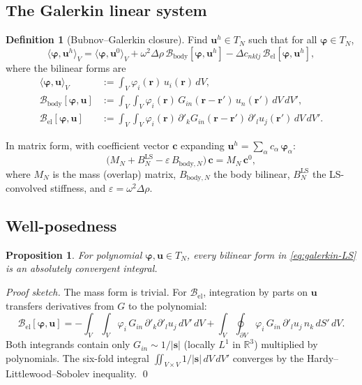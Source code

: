 \documentclass[11pt,a4paper]{article}
\newcommand{\D}{\Delta}
\newcommand{\bs}{\bm{s}}
\newcommand{\br}{\bm{r}}
\newcommand{\bu}{\bm{u}}
\newcommand{\bphi}{\bm{\varphi}}
\newcommand{\R}{\mathbb{R}}
\newcommand{\Bbody}{\mathcal{B}_{\mathrm{body}}}
\newcommand{\Bel}{\mathcal{B}_{\mathrm{el}}}
\newcommand{\BLS}{B^{\mathrm{LS}}}
\theoremstyle{plain}
\newtheorem{proposition}[theorem]{Proposition}
\theoremstyle{definition}
\newtheorem{definition}[theorem]{Definition}
\theoremstyle{remark}
\begin{document}
\subsection{The Galerkin linear system}

\begin{definition}[Bubnov--Galerkin closure]
Find $\bu^h \in T_N$ such that for all $\bphi \in T_N$,
\begin{equation}
  \langle\bphi,\bu^h\rangle_V
  = \langle\bphi,\bu^0\rangle_V
  + \omega^2\D\rho\,\Bbody[\bphi,\bu^h]
  - \D c_{nklj}\,\Bel[\bphi,\bu^h],
  \label{eq:galerkin-LS}
\end{equation}
where the bilinear forms are
\begin{align}
  \langle\bphi,\bu\rangle_V &:= \int_V \varphi_i(\br)\,u_i(\br)\,dV,
  \label{eq:mass-form}\\[4pt]
  \Bbody[\bphi,\bu] &:= \int_V\!\!\int_V \varphi_i(\br)\,
    G_{in}(\br-\br')\,u_n(\br')\,dV\,dV',
  \label{eq:body-form}\\[4pt]
  \Bel[\bphi,\bu] &:= \int_V\!\!\int_V \varphi_i(\br)\,
    \partial'_k G_{in}(\br-\br')\,\partial'_l u_j(\br')\,dV\,dV'.
  \label{eq:elastic-form}
\end{align}
\end{definition}

In matrix form, with coefficient vector $\bm{c}$ expanding
$\bu^h = \sum_\alpha c_\alpha\,\bphi_\alpha$:
\begin{equation}
  \bigl(M_N + \BLS_N - \varepsilon\,B_{\mathrm{body},N}\bigr)\,\bm{c}
  = M_N\,\bm{c}^0,
  \label{eq:galerkin-matrix}
\end{equation}
where $M_N$ is the mass (overlap) matrix, $B_{\mathrm{body},N}$ the
body bilinear, $\BLS_N$ the LS-convolved stiffness, and
$\varepsilon = \omega^2\D\rho$.

\subsection{Well-posedness}

\begin{proposition}\label{prop:wellposed}
For polynomial $\bphi, \bu \in T_N$, every bilinear form in
\eqref{eq:galerkin-LS} is an absolutely convergent integral.
\end{proposition}
\begin{proof}[Proof sketch]
The mass form is trivial.  For $\Bel$, integration by parts on $\bu$
transfers derivatives from $G$ to the polynomial:
\begin{equation}
  \Bel[\bphi,\bu]
  = -\!\int_V\!\!\int_V \varphi_i\,G_{in}\,\partial'_k\partial'_l u_j\,dV'\,dV
  + \int_V\!\!\oint_{\partial V} \varphi_i\,G_{in}\,\partial'_l u_j\,n_k\,dS'\,dV.
  \label{eq:ibp}
\end{equation}
Both integrands contain only $G_{in} \sim 1/|\bs|$ (locally $L^1$
in $\R^3$) multiplied by polynomials.  The six-fold integral
$\iint_{V\times V} 1/|\bs|\,dV\,dV'$ converges by the
Hardy--Littlewood--Sobolev inequality.
\qed
\end{proof}
\end{document}
